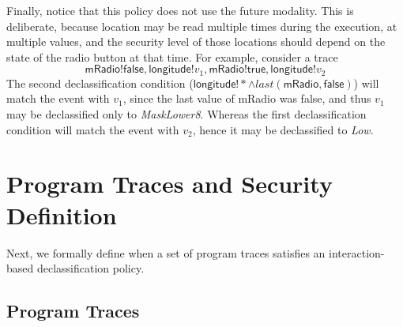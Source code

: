 \documentclass{llncs}
\newcommand{\code}[1]{\textsf{#1}} %
\newcommand{\tlast}[2]{\textit{last}(#1, #2)}
\begin{document}
Finally, notice that this policy does not use the future
modality. This is deliberate, because location may be read multiple
times during the execution, at multiple values, and the security level
of those locations should depend on the state of the
radio button at that time. For example, consider a trace
\begin{displaymath}
   \code{mRadio!false}, \code{longitude!}v_1,
    \code{mRadio!true}, \code{longitude!}v_2
\end{displaymath}
The second declassification condition ($\code{longitude}!\ast \wedge
\tlast{\code{mRadio}}{\code{false}}$) will match the event with $v_1$, since
the last value of \code{mRadio} was \code{false}, and
thus $v_1$ may be declassified only to \textit{MaskLower8}. Whereas
the first declassification condition will match the event with $v_2$, hence it
may be declassified to \textit{Low}.

\section{Program Traces and Security Definition}
\label{sec:formalism}

Next, we formally define when a set of program traces satisfies an
interaction-based declassification policy.

\subsection{Program Traces}
\label{sec:traces}
\end{document}
